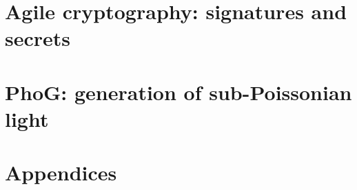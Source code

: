 \documentclass[ twoside,openright,titlepage,numbers=noenddot,%
                headinclude,footinclude,cleardoublepage=empty,abstract=on,
                BCOR=5mm,paper=a4,fontsize=11pt
                ]{scrreprt}
\begin{document}
\frenchspacing
\raggedbottom
{} %




\pagestyle{empty}

\cleardoublepage




\pagestyle{plain}
\setcounter{page}{1}


\cleardoublepage





\cleardoublepage
{}
\tableofcontents
\cleardoublepage




\setcounter{page}{1}
\pagestyle{scrheadings}

\setcounter{tocdepth}{1}

\part{Agile cryptography: signatures and secrets}




\part{PhoG: generation of sub-Poissonian light}


\part{Appendices}
\appendix









\printbibliography[heading=bibintoc]
\end{document}
